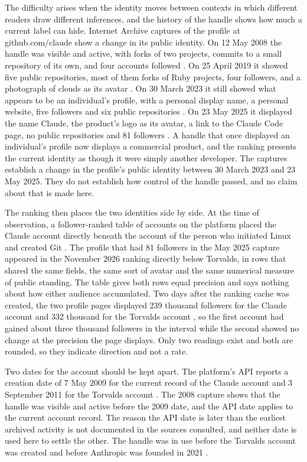 \documentclass[11pt]{article}
\begin{document}
The difficulty arises when the identity moves between contexts in which different readers draw different inferences, and the history of the handle shows how much a current label can hide. Internet Archive captures of the profile at github.com/claude show a change in its public identity. On 12 May 2008 the handle was visible and active, with forks of two projects, commits to a small repository of its own, and four accounts followed \cite{wayback2008}. On 25 April 2019 it showed five public repositories, most of them forks of Ruby projects, four followers, and a photograph of clouds as its avatar \cite{wayback2019}. On 30 March 2023 it still showed what appears to be an individual's profile, with a personal display name, a personal website, five followers and six public repositories \cite{wayback2023}. On 23 May 2025 it displayed the name Claude, the product's logo as its avatar, a link to the Claude Code page, no public repositories and 81 followers \cite{wayback2025}. A handle that once displayed an individual's profile now displays a commercial product, and the ranking presents the current identity as though it were simply another developer. The captures establish a change in the profile's public identity between 30 March 2023 and 23 May 2025. They do not establish how control of the handle passed, and no claim about that is made here.

The ranking then places the two identities side by side. At the time of observation, a follower-ranked table of accounts on the platform placed the Claude account directly beneath the account of the person who initiated Linux and created Git \cite{leaderboard}. The profile that had 81 followers in the May 2025 capture appeared in the November 2026 ranking directly below Torvalds, in rows that shared the same fields, the same sort of avatar and the same numerical measure of public standing. The table gives both rows equal precision and says nothing about how either audience accumulated. Two days after the ranking cache was created, the two profile pages displayed 239 thousand followers for the Claude account and 332 thousand for the Torvalds account \cite{profiles}, so the first account had gained about three thousand followers in the interval while the second showed no change at the precision the page displays. Only two readings exist and both are rounded, so they indicate direction and not a rate.

Two dates for the account should be kept apart. The platform's API reports a creation date of 7 May 2009 for the current record of the Claude account and 3 September 2011 for the Torvalds account \cite{apidata}. The 2008 capture shows that the handle was visible and active before the 2009 date, and the API date applies to the current account record. The reason the API date is later than the earliest archived activity is not documented in the sources consulted, and neither date is used here to settle the other. The handle was in use before the Torvalds account was created and before Anthropic was founded in 2021 \cite{anthropicwiki}.
\end{document}
